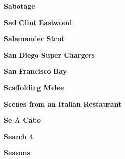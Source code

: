 \vspace{10pt} 
\begin{center}\textbf{Sabotage}\end{center}
\newline
\vspace{10pt} 
\begin{center}\textbf{Sad Clint Eastwood}\end{center}
\newline
\vspace{10pt} 
\begin{center}\textbf{Salamander Strut}\end{center}
\newline
\vspace{10pt} 
\begin{center}\textbf{San Diego Super Chargers}\end{center}
\newline
\vspace{10pt} 
\begin{center}\textbf{San Francisco Bay}\end{center}
\newline
\vspace{10pt} 
\begin{center}\textbf{Scaffolding Melee}\end{center}
\newline
\vspace{10pt} 
\begin{center}\textbf{Scenes from an Italian Restaurant}\end{center}
\newline
\vspace{10pt} 
\begin{center}\textbf{Se A Cabo}\end{center}
\newline
\vspace{10pt} 
\begin{center}\textbf{Search 4}\end{center}
\newline
\vspace{10pt} 
\begin{center}\textbf{Seasons}\end{center}
